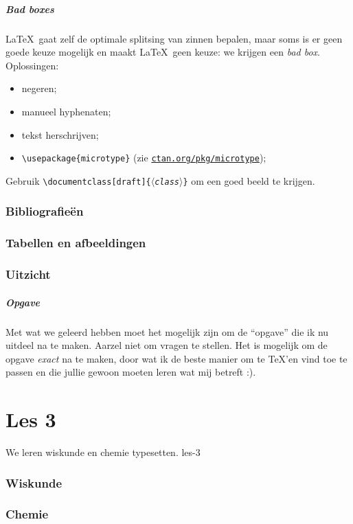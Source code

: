 \documentclass{beamer}
\newcommand\package[1]{\href{http://ctan.org/pkg/#1}{\texttt{ctan.org/pkg/#1}}}
\newcommand\exercise{
\begin{frame}
  \frametitle{Opgave}

  Met wat we geleerd hebben moet het mogelijk zijn om de ``opgave'' die ik nu uitdeel na te maken. Aarzel niet om vragen te stellen. Het is mogelijk om de opgave \emph{exact} na te maken, door wat ik de beste manier om te \TeX'en vind toe te passen en die jullie gewoon moeten leren wat mij betreft :).
\end{frame}
}
\begin{document}
\begin{frame}
  \frametitle{Bad boxes}

  \LaTeX\ gaat zelf de optimale splitsing van zinnen bepalen, maar soms is er geen goede keuze mogelijk en maakt \LaTeX\ geen keuze: we krijgen een \emph{bad box}. Oplossingen:
  \begin{itemize}
    \item negeren;
    \item manueel hyphenaten;
    \item tekst herschrijven;
    \item \texttt{\textcolor{uagreen}{\textbackslash usepackage}\{microtype\}} (zie \package{microtype});
  \end{itemize}

  Gebruik \texttt{\textcolor{uagreen}{\textbackslash documentclass}[draft]\{$\langle$\textsl{class}$\rangle$\}} om een goed beeld te krijgen.
\end{frame}

\section{Bibliografie\"en}

\section{Tabellen en afbeeldingen}

\section{Uitzicht}


\exercise

\part{Les 3}
\lecture
{We leren wiskunde en chemie typesetten.}
{les-3}
\section{Wiskunde}

\section{Chemie}



%
%
%
%
%
\end{document}
